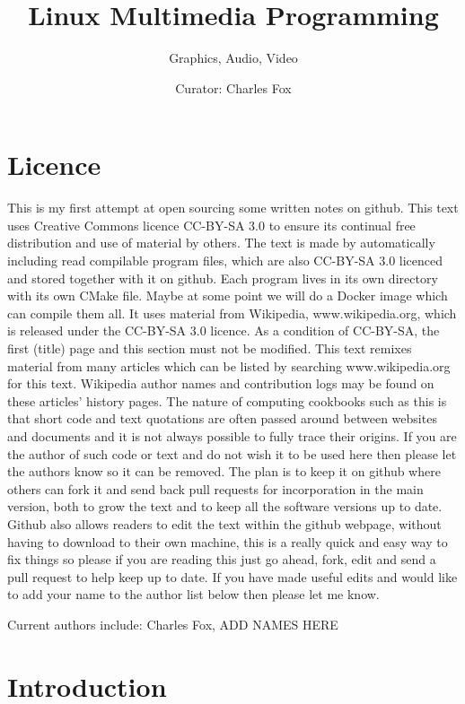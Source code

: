 \documentclass[oneside,english]{scrbook}
\begin{document}
\title{Linux Multimedia Programming}
\author{Graphics, Audio, Video}
\date{Curator: Charles Fox}
\publishers{Licence: CC-BY-SA 3.0}
\maketitle

\chapter*{Licence}

This is my first attempt at open sourcing some written notes on github.  This text uses Creative Commons licence CC-BY-SA 3.0 to ensure its continual free distribution and use of material by others. The text is made by automatically including read compilable program files, which are also CC-BY-SA 3.0 licenced and stored together with it on github. Each program lives in its own directory with its own CMake file.  Maybe at some point we will do a Docker image which can compile them all.  It uses material from Wikipedia, www.wikipedia.org, which is released under the CC-BY-SA 3.0 licence. As a condition of CC-BY-SA, the first (title) page and this section must not be modified.  This text remixes material from many articles which can be listed by searching www.wikipedia.org for this text.  Wikipedia author names and contribution logs may be found on these articles' history pages.   The nature of computing cookbooks such as this is that short code and text quotations are often passed around between websites and documents and it is not always possible to fully trace their origins. If you are the author of such code or text and do not wish it to be used here then please let the authors know so it can be removed. The plan is to keep it on github where others can fork it and send back pull requests for incorporation in the main version, both to grow the text and to keep all the software versions up to date. Github also allows readers to edit the text within the github webpage, without having to download to their own machine, this is a really quick and easy way to fix things so please if you are reading this just go ahead, fork, edit and send a pull request to help keep up to date. If you have made useful edits and would like to add your name to the author list below then please let me know.

Current authors include: Charles Fox, ADD NAMES HERE

\tableofcontents

\chapter{Introduction}
\end{document}
